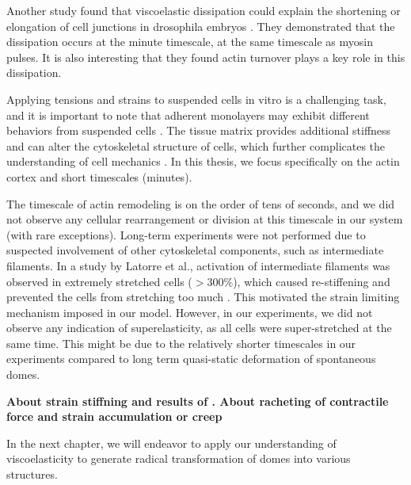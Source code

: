 Another study found that viscoelastic dissipation could explain the shortening or elongation of cell junctions in drosophila embryos \cite{clement2017}. They demonstrated that the dissipation occurs at the minute timescale, at the same timescale as myosin pulses. It is also interesting that they found actin turnover plays a key role in this dissipation.

Applying tensions and strains to suspended cells in vitro is a challenging task, and it is important to note that adherent monolayers may exhibit different behaviors from suspended cells \cite{harris2012}. The tissue matrix provides additional stiffness and can alter the cytoskeletal structure of cells, which further complicates the understanding of cell mechanics \cite{humphrey2014, kechagia2019}. In this thesis, we focus specifically on the actin cortex and short timescales (minutes).

The timescale of actin remodeling is on the order of tens of seconds, and we did not observe any cellular rearrangement or division at this timescale in our system (with rare exceptions). Long-term experiments were not performed due to suspected involvement of other cytoskeletal components, such as intermediate filaments. In a study by Latorre et al., activation of intermediate filaments was observed in extremely stretched cells ($>300\%$), which caused re-stiffening and prevented the cells from stretching too much \cite{latorre2018}. This motivated the strain limiting mechanism imposed in our model. However, in our experiments, we did not observe any indication of superelasticity, as all cells were super-stretched at the same time. This might be due to the relatively shorter timescales in our experiments compared to long term quasi-static deformation of spontaneous domes.

\textbf{About strain stiffning and results of \cite{duque2023}. About racheting of contractile force \cite{clement2017, mason2011} and strain accumulation or creep}

In the next chapter, we will endeavor to apply our understanding of viscoelasticity to generate radical transformation of domes into various structures.